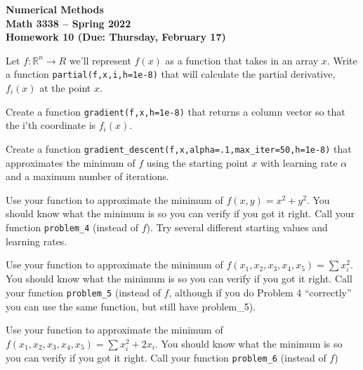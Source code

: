 \documentclass[11pt,letterpaper]{article}
\newcommand{\semester}{Spring 2022}
\newcommand{\due}{Thursday, February 17}
\begin{document}
\newpage

\begin{center}
{\huge{\bf  Numerical Methods}} \\[1.5ex]
{\bf Math 3338 -- \semester}\\[1.5ex]
{\Large{\bf Homework 10 (Due: \due)}}\\
\end{center}
\vspace{2mm}

\begin{problem}
 Let $f:\mathbb{R}^n \rightarrow R$ we'll represent $f(x)$ as a function that takes in an array $x$. Write a function \texttt{partial(f,x,i,h=1e-8)} that will calculate the partial derivative, $f_i(x)$ at the point $x$.
\end{problem}


\begin{problem}
 Create a function \texttt{gradient(f,x,h=1e-8)} that returns a column vector so that the i'th coordinate is $f_i(x)$.
\end{problem}

\begin{problem}
 Create a function \texttt{gradient\_descent(f,x,alpha=.1,max\_iter=50,h=1e-8)} that approximates the minimum of $f$ using the starting point $x$ with learning rate $\alpha$ and a maximum number of iterations. 
\end{problem}


\begin{problem}
 Use your function to approximate the minimum of $f(x,y) = x^2+y^2$. You should know what the minimum is so you can verify if you got it right. Call your function \texttt{problem\_4} (instead of $f$). Try several different starting values and learning rates.
\end{problem}


\begin{problem}
 Use your function to approximate the minimum of $f(x_1,x_2,x_3,x_4,x_5) = \sum x_i^2$. You should know what the minimum is so you can verify if you got it right. Call your function \texttt{problem\_5} (instead of $f$, although if you do Problem 4 ``correctly'' you can use the same function, but still have problem\_5).
\end{problem}


\begin{problem}
 Use your function to approximate the minimum of $f(x_1,x_2,x_3,x_4,x_5) = \sum x_i^2 + 2x_i$. You should know what the minimum is so you can verify if you got it right. Call your function \texttt{problem\_6} (instead of $f$)
\end{problem}
\end{document}
